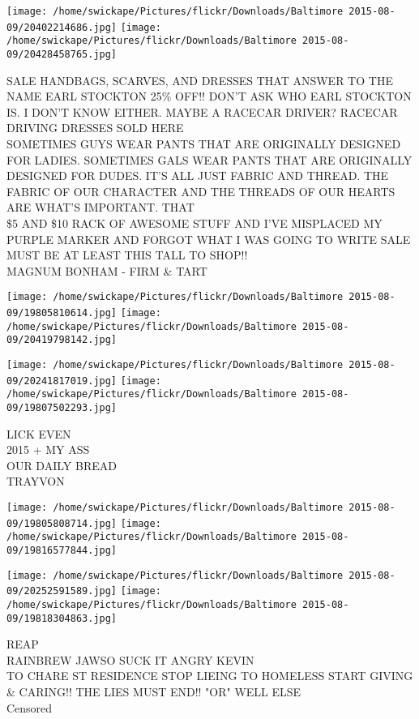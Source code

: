 \documentclass[10pt,letterpaper]{article}
\begin{document}
\texttt{[image: /home/swickape/Pictures/flickr/Downloads/Baltimore 2015-08-09/20402214686.jpg]}
\texttt{[image: /home/swickape/Pictures/flickr/Downloads/Baltimore 2015-08-09/20428458765.jpg]}

SALE HANDBAGS, SCARVES, AND DRESSES THAT ANSWER TO THE NAME EARL STOCKTON 25\% OFF!!  DON'T ASK WHO EARL STOCKTON IS.  I DON'T KNOW EITHER.  MAYBE A RACECAR DRIVER?  RACECAR DRIVING DRESSES SOLD HERE\\
SOMETIMES GUYS WEAR PANTS THAT ARE ORIGINALLY DESIGNED FOR LADIES.  SOMETIMES GALS WEAR PANTS THAT ARE ORIGINALLY DESIGNED FOR DUDES.  IT'S ALL JUST FABRIC AND THREAD.  THE FABRIC OF OUR CHARACTER AND THE THREADS OF OUR HEARTS ARE WHAT'S IMPORTANT.  THAT\\
\$5 AND \$10 RACK OF AWESOME STUFF AND I'VE MISPLACED MY PURPLE MARKER AND FORGOT WHAT I WAS GOING TO WRITE SALE MUST BE AT LEAST THIS TALL TO SHOP!!\\
MAGNUM BONHAM {-} FIRM \& TART\\
\pagebreak

\texttt{[image: /home/swickape/Pictures/flickr/Downloads/Baltimore 2015-08-09/19805810614.jpg]}
\texttt{[image: /home/swickape/Pictures/flickr/Downloads/Baltimore 2015-08-09/20419798142.jpg]}

\texttt{[image: /home/swickape/Pictures/flickr/Downloads/Baltimore 2015-08-09/20241817019.jpg]}
\texttt{[image: /home/swickape/Pictures/flickr/Downloads/Baltimore 2015-08-09/19807502293.jpg]}

LICK EVEN\\
2015 + MY ASS\\
OUR DAILY BREAD\\
TRAYVON\\
\pagebreak

\texttt{[image: /home/swickape/Pictures/flickr/Downloads/Baltimore 2015-08-09/19805808714.jpg]}
\texttt{[image: /home/swickape/Pictures/flickr/Downloads/Baltimore 2015-08-09/19816577844.jpg]}

\texttt{[image: /home/swickape/Pictures/flickr/Downloads/Baltimore 2015-08-09/20252591589.jpg]}
\texttt{[image: /home/swickape/Pictures/flickr/Downloads/Baltimore 2015-08-09/19818304863.jpg]}

REAP\\
RAINBREW JAWSO SUCK IT ANGRY KEVIN\\
TO CHARE ST RESIDENCE STOP LIEING TO HOMELESS START GIVING \& CARING!! THE LIES MUST END!! "OR" WELL ELSE\\
Censored\\
\pagebreak
\end{document}
